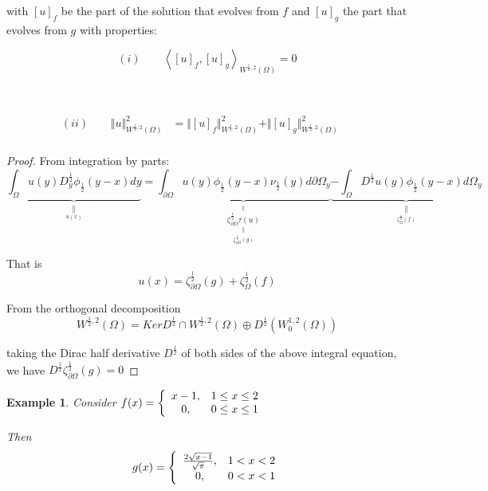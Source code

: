 \documentclass{amsart}%
\theoremstyle{plain}
\newtheorem{example}{Example}
\numberwithin{equation}{section}
\begin{document}
with $\left[  u\right]  _{f}$ be the part of the solution that evolves from
$f$ and $\left[  u\right]  _{g}$ the part that evolves from $g$ with properties:%

\[
\left(  i\right)  \ \ \ \ \ \ \ \ \ \left\langle \left[  u\right]
_{f},\left[  u\right]  _{g}\right\rangle _{W^{\frac{1}{2},2}\left(
\Omega\right)  }=0
\]


\ \ %

\begin{align*}
\left(  ii\right)  \ \ \ \ \ \ \ \ \ \Vert u\Vert_{W^{\frac{1}{2},2}\left(
\Omega\right)  }^{2}  & =\Vert\left[  u\right]  _{f}\Vert_{W^{\frac{1}{2}%
,2}\left(  \Omega\right)  }^{2}+\Vert\left[  u\right]  _{g}\Vert_{W^{\frac
{1}{2},2}\left(  \Omega\right)  }^{2}\ \ \ \ \ \ \\
&
\end{align*}


\begin{proof}
From integration by parts:%
\[
\underset{\underset{u(x)}{\parallel}}{\underbrace{\int_{\Omega}u(y)D_{y}%
^{\frac{1}{2}}\phi_{\frac{1}{2}}\left(  y-x\right)  dy}}%
=\underset{\overset{\parallel}{\underset{\zeta_{\partial\Omega}^{\frac{1}{2}%
}(g)}{\underset{\parallel}{\zeta_{\partial\Omega}^{\frac{1}{2}}\tau\left(
u\right)  }}}}{\underbrace{\int_{\partial\Omega}u(y)\phi_{\frac{1}{2}}\left(
y-x\right)  \nu_{\frac{1}{2}}\left(  y\right)  d\partial\Omega_{y}}%
}\underset{\underset{\zeta_{\Omega}^{\frac{1}{2}}\left(  f\right)
}{\parallel}}{\underbrace{-\int_{\Omega}D^{\frac{1}{2}}u(y)\phi_{\frac{1}{2}%
}\left(  y-x\right)  d\Omega_{y}}}%
\]


That is%
\begin{equation}
u(x)=\zeta_{\partial\Omega}^{\frac{1}{2}}(g)+\zeta_{\Omega}^{\frac{1}{2}%
}\left(  f\right) \label{sol1}%
\end{equation}


From the orthogonal decomposition
\[
W^{\frac{1}{2},2}\left(  \Omega\right)  =KerD^{\frac{1}{2}}\cap W^{\frac{1}%
{2},2}\left(  \Omega\right)  \oplus D^{\frac{1}{2}}\left(  W_{0}^{1,2}\left(
\Omega\right)  \right)
\]


taking the Dirac half derivative $D^{\frac{1}{2}}$ of both sides of the above
integral equation, we have $D^{\frac{1}{2}}\zeta_{\partial\Omega}^{\frac{1}%
{2}}(g)=0$
\end{proof}

\begin{example}
Consider $f(x)=\left\{
\begin{array}
[c]{cc}%
x-1, & 1\leq x\leq2\\
0, & 0\leq x\leq1
\end{array}
\right.  $

Then
\[
g(x)=\left\{
\begin{array}
[c]{cc}%
\frac{2\sqrt{x-1}}{\sqrt{\pi}}, & 1<x<2\\
0, & 0<x<1
\end{array}
\right.
\]

\end{example}
\end{document}
